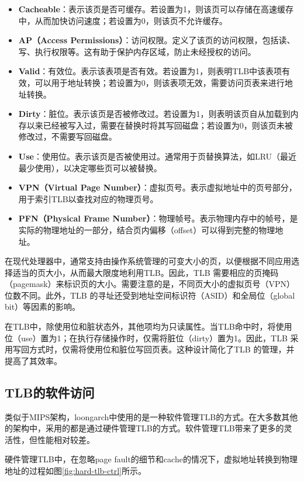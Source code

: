 \begin{itemize}
\tightlist
\item
  \textbf{Cacheable}：表示该页是否可缓存。若设置为1，则该页可以存储在高速缓存中，从而加快访问速度；若设置为0，则该页不允许缓存。
\item
  \textbf{AP（Access Permissions）}：访问权限。定义了该页的访问权限，包括读、写、执行权限等。这有助于保护内存区域，防止未经授权的访问。
\item
  \textbf{Valid}：有效位。表示该表项是否有效。若设置为1，则表明TLB中该表项有效，可以用于地址转换；若设置为0，则该表项无效，需要访问页表来进行地址转换。
\item
  \textbf{Dirty}：脏位。表示该页是否被修改过。若设置为1，则表明该页自从加载到内存以来已经被写入过，需要在替换时将其写回磁盘；若设置为0，则该页未被修改过，不需要写回磁盘。
\item
  \textbf{Use}：使用位。表示该页是否被使用过。通常用于页替换算法，如LRU（最近最少使用），以决定哪些页可以被替换。
\item
  \textbf{VPN（Virtual Page Number）}：虚拟页号。表示虚拟地址中的页号部分，用于索引TLB以查找对应的物理页号。
\item
  \textbf{PFN（Physical Frame Number）}：物理帧号。表示物理内存中的帧号，是实际的物理地址的一部分，结合页内偏移（offset）可以得到完整的物理地址。
\end{itemize}

在现代处理器中，通常支持由操作系统管理的可变大小的页，以便根据不同应用选择适当的页大小，从而最大限度地利用TLB。因此，TLB 需要相应的页掩码（pagemask）来标识页的大小。需要注意的是，不同页大小的虚拟页号（VPN）位数不同。此外，TLB 的寻址还受到地址空间标识符（ASID）和全局位（global bit）等因素的影响。

在TLB中，除使用位和脏状态外，其他项均为只读属性。当TLB命中时，将使用位（use）置为1；在执行存储操作时，仅需将脏位（dirty）置为1。因此，TLB 采用写回方式时，仅需将使用位和脏位写回页表。这种设计简化了TLB 的管理，并提高了其效率。

\subsection{TLB的软件访问}\label{sec:10-mmu-003}

类似于MIPS架构，loongarch中使用的是一种软件管理TLB的方式。在大多数其他的架构中，采用的都是通过硬件管理TLB的方式。软件管理TLB带来了更多的灵活性，但性能相对较差。

硬件管理TLB中，在忽略page fault的细节和cache的情况下，虚拟地址转换到物理地址的过程如图\ref{fig:hard-tlb-ctrl}所示。

